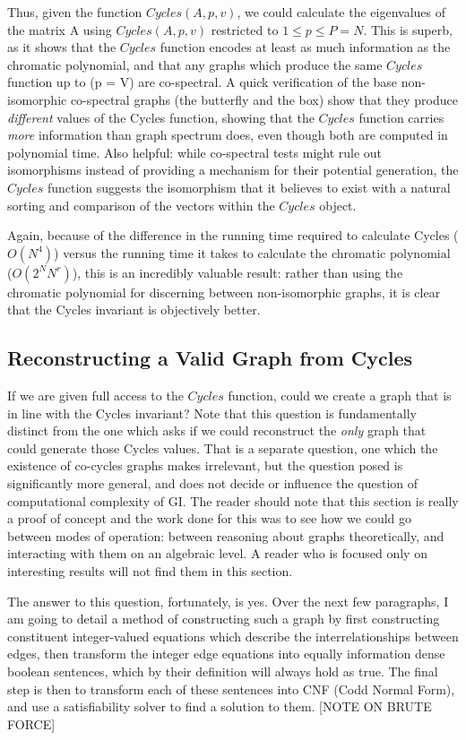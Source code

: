 Thus, given the function $Cycles(A, p, v)$, we could calculate the eigenvalues of the matrix A using $Cycles(A, p, v)$ restricted to $1 \leq p \leq P = N$. 
This is superb, as it shows that the $Cycles$ function encodes at least as much information as the chromatic polynomial, and that any graphs which produce the same $Cycles$ function up to (p = V) are co-spectral. 
A quick verification of the base non-isomorphic co-spectral graphs (the butterfly and the box) show that they produce \emph{different} values of the Cycles function, showing that the $Cycles$ function carries \emph{more} information than graph spectrum does, even though both are computed in polynomial time. 
Also helpful: while co-spectral tests might rule out isomorphisms instead of providing a mechanism for their potential generation, the $Cycles$ function suggests the isomorphism that it believes to exist with a natural sorting and comparison of the vectors within the $Cycles$ object.

Again, because of the difference in the running time required to calculate Cycles ($O(N^4)$) versus the running time it takes to calculate the chromatic polynomial ($O(2^N N^r)$), this is an incredibly valuable result: rather than using the chromatic polynomial for discerning between non-isomorphic graphs, it is clear that the Cycles invariant is objectively better.

\subsection{Reconstructing a Valid Graph from Cycles}
If we are given full access to the $Cycles$ function, could we create a graph that is in line with the Cycles invariant?
Note that this question is fundamentally distinct from the one which asks if we could reconstruct the \emph{only} graph that could generate those Cycles values.
That is a separate question, one which the existence of co-cycles graphs makes irrelevant, but the question posed is significantly more general, and does not decide or influence the question of computational complexity of GI.
The reader should note that this section is really a proof of concept and the work done for this was to see how we could go between modes of operation: between reasoning about graphs theoretically, and interacting with them on an algebraic level.
A reader who is focused only on interesting results will not find them in this section.

The answer to this question, fortunately, is yes.  
Over the next few paragraphs, I am going to detail a method of constructing such a graph by first constructing constituent integer-valued equations which describe the interrelationships between edges, then transform the integer edge equations into equally information dense boolean sentences, which by their definition will always hold as true.  
The final step is then to transform each of these sentences into CNF (Codd Normal Form), and use a satisfiability solver to find a solution to them.
[NOTE ON BRUTE FORCE]

